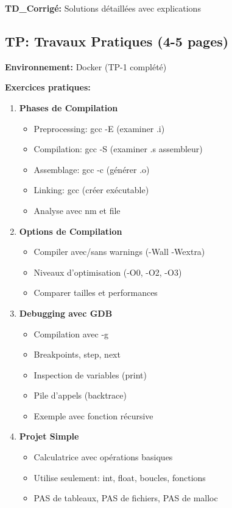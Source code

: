\documentclass[10pt,a4paper]{article}
\begin{document}
\textbf{TD\_Corrigé:} Solutions détaillées avec explications

\subsection*{TP: Travaux Pratiques (4-5 pages)}

\textbf{Environnement:} Docker (TP-1 complété)

\textbf{Exercices pratiques:}
\begin{enumerate}
\item \textbf{Phases de Compilation}
   \begin{itemize}
   \item Preprocessing: gcc -E (examiner .i)
   \item Compilation: gcc -S (examiner .s assembleur)
   \item Assemblage: gcc -c (générer .o)
   \item Linking: gcc (créer exécutable)
   \item Analyse avec nm et file
   \end{itemize}

\item \textbf{Options de Compilation}
   \begin{itemize}
   \item Compiler avec/sans warnings (-Wall -Wextra)
   \item Niveaux d'optimisation (-O0, -O2, -O3)
   \item Comparer tailles et performances
   \end{itemize}

\item \textbf{Debugging avec GDB}
   \begin{itemize}
   \item Compilation avec -g
   \item Breakpoints, step, next
   \item Inspection de variables (print)
   \item Pile d'appels (backtrace)
   \item Exemple avec fonction récursive
   \end{itemize}

\item \textbf{Projet Simple}
   \begin{itemize}
   \item Calculatrice avec opérations basiques
   \item Utilise seulement: int, float, boucles, fonctions
   \item PAS de tableaux, PAS de fichiers, PAS de malloc
   \end{itemize}
\end{enumerate}
\end{document}
